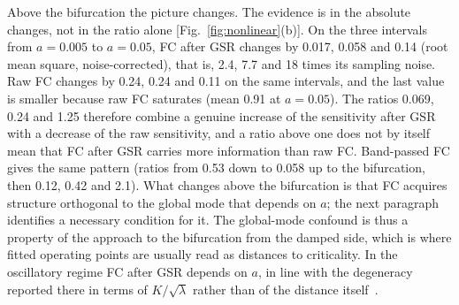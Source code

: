 \documentclass[aip,cha,reprint,amsmath,amssymb]{revtex4-2}
\theoremstyle{remark}
\begin{document}
Above the bifurcation the picture changes. The evidence is in the absolute changes, not in the ratio alone [Fig.~\ref{fig:nonlinear}(b)]. On the three intervals from $a=0.005$ to $a=0.05$, FC after GSR changes by 0.017, 0.058 and 0.14 (root mean square, noise-corrected), that is, 2.4, 7.7 and 18 times its sampling noise. Raw FC changes by 0.24, 0.24 and 0.11 on the same intervals, and the last value is smaller because raw FC saturates (mean 0.91 at $a=0.05$). The ratios 0.069, 0.24 and 1.25 therefore combine a genuine increase of the sensitivity after GSR with a decrease of the raw sensitivity, and a ratio above one does not by itself mean that FC after GSR carries more information than raw FC. Band-passed FC gives the same pattern (ratios from 0.53 down to 0.058 up to the bifurcation, then 0.12, 0.42 and 2.1). What changes above the bifurcation is that FC acquires structure orthogonal to the global mode that depends on $a$; the next paragraph identifies a necessary condition for it. The global-mode confound is thus a property of the approach to the bifurcation from the damped side, which is where fitted operating points are usually read as distances to criticality. In the oscillatory regime FC after GSR depends on $a$, in line with the degeneracy reported there in terms of $K/\sqrt\lambda$ rather than of the distance itself~\cite{Alexandersen2025}.
\end{document}
